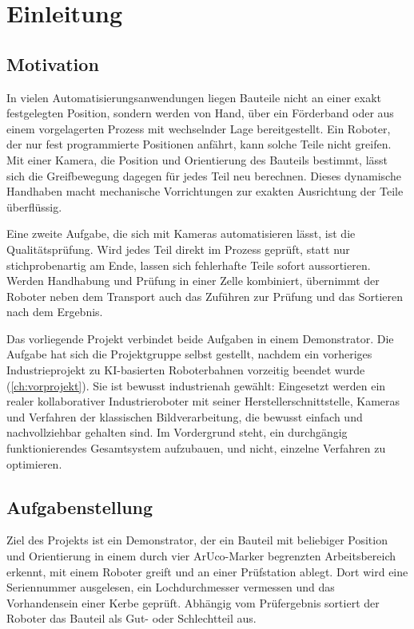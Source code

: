 \chapter{Einleitung}
\label{ch:einleitung}

\section{Motivation}

In vielen Automatisierungsanwendungen liegen Bauteile nicht an einer exakt festgelegten
Position, sondern werden von Hand, über ein Förderband oder aus einem vorgelagerten Prozess mit
wechselnder Lage bereitgestellt. Ein Roboter, der nur fest programmierte Positionen anfährt,
kann solche Teile nicht greifen. Mit einer Kamera, die Position und Orientierung des Bauteils
bestimmt, lässt sich die Greifbewegung dagegen für jedes Teil neu berechnen. Dieses dynamische
Handhaben macht mechanische Vorrichtungen zur exakten Ausrichtung der Teile überflüssig.

Eine zweite Aufgabe, die sich mit Kameras automatisieren lässt, ist die Qualitätsprüfung.
Wird jedes Teil direkt im Prozess geprüft, statt nur stichprobenartig am Ende, lassen sich
fehlerhafte Teile sofort aussortieren. Werden Handhabung und Prüfung in einer Zelle
kombiniert, übernimmt der Roboter neben dem Transport auch das Zuführen zur Prüfung und das
Sortieren nach dem Ergebnis.

Das vorliegende Projekt verbindet beide Aufgaben in einem Demonstrator. Die Aufgabe hat sich
die Projektgruppe selbst gestellt, nachdem ein vorheriges Industrieprojekt zu KI-basierten
Roboterbahnen vorzeitig beendet wurde (\cref{ch:vorprojekt}). Sie ist bewusst
industrienah gewählt: Eingesetzt werden ein
realer kollaborativer Industrieroboter mit seiner Herstellerschnittstelle, Kameras und
Verfahren der klassischen Bildverarbeitung, die bewusst einfach und nachvollziehbar gehalten
sind. Im Vordergrund steht, ein durchgängig funktionierendes Gesamtsystem aufzubauen, und
nicht, einzelne Verfahren zu optimieren.


\section{Aufgabenstellung}
Ziel des Projekts ist ein Demonstrator, der ein Bauteil mit beliebiger Position und
Orientierung in einem durch vier ArUco-Marker begrenzten Arbeitsbereich erkennt, mit einem
Roboter greift und an einer Prüfstation ablegt. Dort wird eine Seriennummer ausgelesen,
ein Lochdurchmesser vermessen und das Vorhandensein einer Kerbe geprüft. Abhängig vom
Prüfergebnis sortiert der Roboter das Bauteil als Gut- oder Schlechtteil aus.

